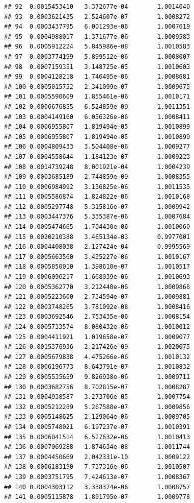 \documentclass{article}\usepackage[]{graphicx}\usepackage[]{xcolor}
\makeatletter
\newenvironment{kframe}{%
 \def\at@end@of@kframe{}%
 \ifinner\ifhmode%
  \def\at@end@of@kframe{\end{minipage}}%
  \begin{minipage}{\columnwidth}%
 \fi\fi%
 \def\FrameCommand##1{\hskip\@totalleftmargin \hskip-\fboxsep
 \colorbox{shadecolor}{##1}\hskip-\fboxsep
     \hskip-\linewidth \hskip-\@totalleftmargin \hskip\columnwidth}%
 \MakeFramed {\advance\hsize-\width
   \@totalleftmargin\z@ \linewidth\hsize
   \@setminipage}}%
 {\par\unskip\endMakeFramed%
 \at@end@of@kframe}
\newenvironment{knitrout}{}{} %
\makeatother
\begin{document}
\begin{knitrout}
\begin{kframe}
\begin{verbatim}
## 92  0.0015453410   3.372677e-04        1.0014040
## 93  0.0003621435   2.524607e-07        1.0008272
## 94  0.0003437795   6.001293e-06        1.0007619
## 95  0.0004988017   1.371677e-06        1.0009583
## 96  0.0005912224   5.845986e-08        1.0010583
## 97  0.0003774199   5.899512e-06        1.0008007
## 98  0.0007159351   3.148725e-05        1.0010603
## 99  0.0004128218   1.746495e-06        1.0008681
## 100 0.0005015752   2.341099e-07        1.0009675
## 101 0.0005590609   1.855461e-06        1.0010171
## 102 0.0006676855   6.524859e-09        1.0011351
## 103 0.0004149160   6.056326e-06        1.0008411
## 104 0.0006955807   1.819494e-05        1.0010899
## 105 0.0006955807   1.819494e-05        1.0010899
## 106 0.0004809433   3.504408e-06        1.0009277
## 107 0.0004558644   1.184123e-07        1.0009223
## 108 0.0014739248   8.001921e-04        1.0004239
## 109 0.0003685189   2.744859e-09        1.0008355
## 110 0.0006984992   3.136825e-06        1.0011535
## 111 0.0005586874   1.824822e-06        1.0010168
## 112 0.0005297748   5.315816e-07        1.0009942
## 113 0.0003447376   5.335387e-06        1.0007684
## 114 0.0005474665   1.704430e-06        1.0010060
## 115 0.0020210388   3.465134e-03        0.9977001
## 116 0.0004408038   2.127424e-04        0.9995569
## 117 0.0005663560   3.435227e-06        1.0010167
## 118 0.0005850010   1.398610e-07        1.0010517
## 119 0.0006096217   1.668039e-06        1.0010693
## 120 0.0005362770   3.212440e-06        1.0009868
## 121 0.0005223600   2.734594e-07        1.0009881
## 122 0.0003748265   3.781092e-08        1.0008416
## 123 0.0003692546   2.753435e-06        1.0008154
## 124 0.0005733574   8.080432e-06        1.0010012
## 125 0.0004411921   1.019658e-07        1.0009077
## 126 0.0015376936   2.217426e-09        1.0020075
## 127 0.0005679838   4.475266e-06        1.0010132
## 128 0.0006196773   8.643791e-07        1.0010832
## 129 0.0005535659   9.826938e-06        1.0009711
## 130 0.0003682756   8.702815e-07        1.0008287
## 131 0.0004938587   3.273706e-05        1.0007754
## 132 0.0005212289   5.267588e-07        1.0009856
## 133 0.0005148625   2.129064e-06        1.0009705
## 134 0.0005748021   6.197237e-07        1.0010391
## 135 0.0006041514   6.527632e-06        1.0010413
## 136 0.0007069288   1.874634e-08        1.0011744
## 137 0.0004450669   2.042331e-10        1.0009122
## 138 0.0006183190   7.737316e-06        1.0010507
## 139 0.0003751795   7.424613e-07        1.0008367
## 140 0.0004303112   3.338374e-06        1.0008757
## 141 0.0005115878   1.891795e-07        1.0009778

\end{verbatim}
\end{kframe}
\end{knitrout}
\end{document}
